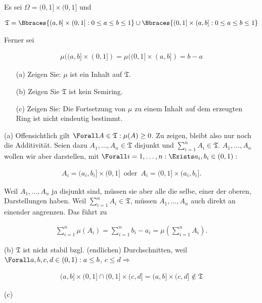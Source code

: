 \begin{exercise}

Es sei $\Omega = (0, 1] \times (0, 1]$ und

\begin{align*}
  \mathfrak{T}
  =
  \Bbraces{(a, b] \times (0, 1]: 0 \leq a \leq b \leq 1}
  \cup
  \Bbraces{(0, 1] \times (a, b]: 0 \leq a \leq b \leq 1}
\end{align*}

Ferner sei

\begin{align*}
  \mu((a, b] \times (0, 1]) = \mu((0, 1] \times (a, b]) = b - a
\end{align*}

\begin{itemize}
  \item[(a)] Zeigen Sie: $\mu$ ist ein Inhalt auf $\mathfrak{T}$.
  \item[(b)] Zeigen Sie $\mathfrak{T}$ ist kein Semiring.
  \item[(c)] Zeigen Sie: Die Fortsetzung von $\mu$ zu einem Inhalt auf dem erzeugten Ring ist nicht eindeutig bestimmt.
\end{itemize}

\end{exercise}

\begin{solution}

(a) Offensichtlich gilt $\Forall A \in \mathfrak{T}: \mu(A) \geq 0$. Zu zeigen, bleibt also nur noch die Additivität. Seien dazu $A_1, \ldots, A_n \in \mathfrak{T}$ disjunkt und $\sum_{i=1}^n A_i \in \mathfrak{T}$. $A_1, \ldots, A_n$ wollen wir aber darstellen, mit $\Forall i = 1, \ldots, n: \Exists a_i, b_i \in (0, 1):$

\begin{align*}
  A_i = (a_i, b_i] \times (0, 1]
  \enspace \text{oder} \enspace
  A_i = (0, 1] \times (a_i, b_i].
\end{align*}

Weil $A_1, \ldots, A_n$ ja disjunkt sind, müssen sie aber alle die selbe, einer der oberen, Darstellungen haben. Weil $\sum_{i=1}^n A_i \in \mathfrak{T}$, müssen $A_1, \ldots, A_n$ auch direkt an einender angrenzen. Das führt zu

\begin{align*}
  \sum_{i=1}^n \mu(A_i)
  =
  \sum_{i=1}^n b_i - a_i
  =
  \mu(\sum_{i=1}^n A_i).
\end{align*}

(b) $\mathfrak{T}$ ist nicht stabil bzgl. (endlichen) Durchschnitten, weil $\Forall a, b, c, d \in (0, 1): a \leq b$, $c \leq d \Rightarrow$

\begin{align*}
  (a, b] \times (0, 1]
  \cap
  (0, 1] \times (c, d]
  =
  (a, b] \times (c, d]
  \notin \mathfrak{T}
\end{align*}

(c)

\end{solution}

